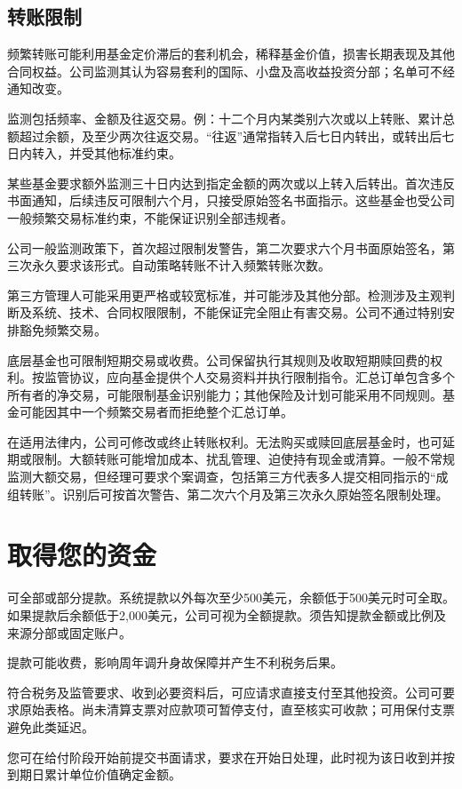 \documentclass[UTF8,fontset=none,11pt,a4paper]{ctexart}
\begin{document}
\subsection*{转账限制}
频繁转账可能利用基金定价滞后的套利机会，稀释基金价值，损害长期表现及其他合同权益。公司监测其认为容易套利的国际、小盘及高收益投资分部；名单可不经通知改变。


监测包括频率、金额及往返交易。例：十二个月内某类别六次或以上转账、累计总额超过余额，及至少两次往返交易。“往返”通常指转入后七日内转出，或转出后七日内转入，并受其他标准约束。


某些基金要求额外监测三十日内达到指定金额的两次或以上转入后转出。首次违反书面通知，后续违反可限制六个月，只接受原始签名书面指示。这些基金也受公司一般频繁交易标准约束，不能保证识别全部违规者。


公司一般监测政策下，首次超过限制发警告，第二次要求六个月书面原始签名，第三次永久要求该形式。自动策略转账不计入频繁转账次数。


第三方管理人可能采用更严格或较宽标准，并可能涉及其他分部。检测涉及主观判断及系统、技术、合同权限限制，不能保证完全阻止有害交易。公司不通过特别安排豁免频繁交易。


底层基金也可限制短期交易或收费。公司保留执行其规则及收取短期赎回费的权利。按监管协议，应向基金提供个人交易资料并执行限制指令。汇总订单包含多个所有者的净交易，可能限制基金识别能力；其他保险及计划可能采用不同规则。基金可能因其中一个频繁交易者而拒绝整个汇总订单。


在适用法律内，公司可修改或终止转账权利。无法购买或赎回底层基金时，也可延期或限制。大额转账可能增加成本、扰乱管理、迫使持有现金或清算。一般不常规监测大额交易，但经理可要求个案调查，包括第三方代表多人提交相同指示的“成组转账”。识别后可按首次警告、第二次六个月及第三次永久原始签名限制处理。


\section*{取得您的资金}
可全部或部分提款。系统提款以外每次至少500美元，余额低于500美元时可全取。如果提款后余额低于2,000美元，公司可视为全额提款。须告知提款金额或比例及来源分部或固定账户。


提款可能收费，影响周年调升身故保障并产生不利税务后果。


符合税务及监管要求、收到必要资料后，可应请求直接支付至其他投资。公司可要求原始表格。尚未清算支票对应款项可暂停支付，直至核实可收款；可用保付支票避免此类延迟。


您可在给付阶段开始前提交书面请求，要求在开始日处理，此时视为该日收到并按到期日累计单位价值确定金额。
\end{document}
